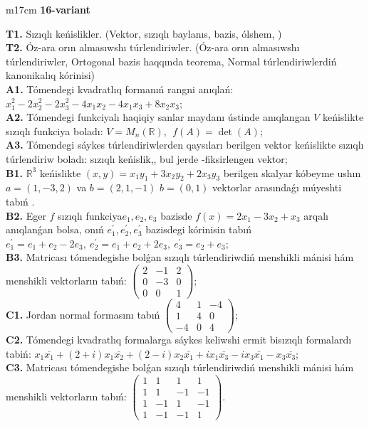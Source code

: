 \documentclass{article}
\begin{document}
\begin{tabular}{m{17cm}}
\textbf{16-variant}
\newline

\textbf{T1.} Sızıqlı keńislikler.   (Vektor,  sızıqlı baylanıs, bazis, ólshem, )  \\
\textbf{T2.} Óz-ara orın almasıwshı túrlendiriwler. (Óz-ara orın almasıwshı túrlendiriwler,  Ortogonal bazis haqqında teorema,  Normal túrlendiriwlerdiń kanonikalıq kórinisi) \\
\textbf{A1.} Tómendegi kvadratlıq formanıń rangni anıqlań: \(x_{1}^{2} - 2x_{2}^{2} - 2x_{3}^{2} - 4x_{1}x_{2} - 4x_{1}x_{3} + 8x_{2}x_{3}\); \\
\textbf{A2.} Tómendegi funkciyalı haqiqiy sanlar maydanı ústinde anıqlangan \(V\) keńislikte sızıqlı funkciya boladı: \(V = M_{n}\left( \mathbb{R} \right),\ \ f(A) = \det(A)\); \\
\textbf{A3.} Tómendegi sáykes túrlendiriwlerden qaysıları berilgen vektor keńislikte sızıqlı túrlendiriw boladı: sızıqlı keńislik,, bul jerde -fiksirlengen vektor; \\
\textbf{B1.} \(\mathbb{R}^{3}\) keńislikte \((x,y) = x_{1}y_{1} + 3x_{2}y_{2} + 2x_{3}y_{3}\) berilgen skalyar kóbeyme ushın \(a = (1, - 3,2)\) va \(b = (2,1, - 1)\) \(b = (0,1)\) vektorlar arasındaǵı múyeshti tabıń . \\
\textbf{B2.} Eger \(f\) sızıqlı funkciya\(e_{1},e_{2},e_{3}\) bazisde \(f(x) = 2x_{1} - 3x_{2} + x_{3}\) arqalı anıqlanǵan bolsa, onıń \(e_{1}^{'},e_{2}^{'},e_{3}^{'}\) bazisdegi kórinisin tabıń\(e_{1}^{'} = e_{1} + e_{2} - 2e_{3},\ e_{2}^{'} = e_{1} + e_{2} + 2e_{3},\ e_{3}^{'} = e_{2} + e_{3}\); \\
\textbf{B3.} Matricası tómendegishe bolǵan sızıqlı túrlendiriwdiń menshikli mánisi hám menshikli vektorların tabıń: \(\begin{pmatrix} 2 & - 1 & 2 \\ 0 & - 3 & 0 \\ 0 & 0 & 1 \end{pmatrix}\); \\
\textbf{C1.} Jordan normal formasını tabıń \(\begin{pmatrix} 4 & 1 & - 4 \\ 1 & 4 & 0 \\  - 4 & 0 & 4 \end{pmatrix}\); \\
\textbf{C2.} Tómendegi kvadratlıq formalarga sáykes keliwshi ermit bisızıqlı formalardı tabiń: \(x_{1}\overline{x_{1}} + (2 + i)x_{1}\overline{x_{2}} + (2 - i)x_{2}\overline{x_{1}} + ix_{1}\overline{x_{3}} - ix_{3}\overline{x_{1}} - x_{3}\overline{x_{3}}\); \\
\textbf{C3.} Matricası tómendegishe bolǵan sızıqlı túrlendiriwdiń menshikli mánisi hám menshikli vektorların tabıń: \(\begin{pmatrix} 1 & 1 & 1 & 1 \\ 1 & 1 & - 1 & - 1 \\ 1 & - 1 & 1 & - 1 \\ 1 & - 1 & - 1 & 1 \end{pmatrix}\). \\

\end{tabular}
\end{document}
